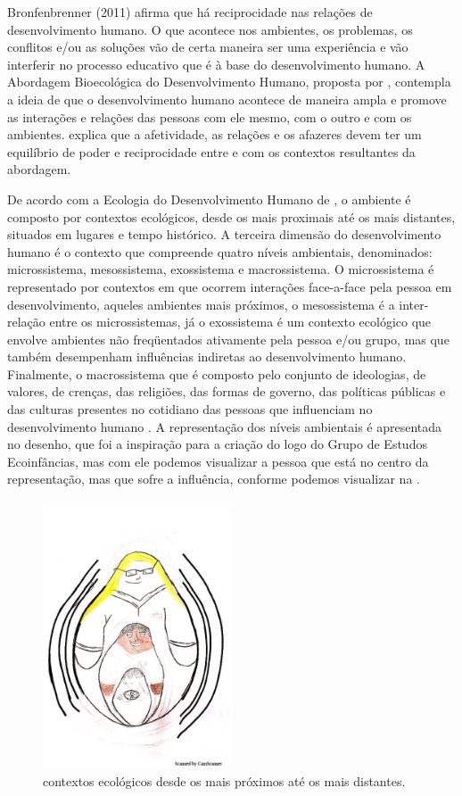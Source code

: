 \documentclass{textolivre-html}
\begin{document}
Bronfenbrenner (2011) afirma que há reciprocidade nas relações de desenvolvimento humano. O que acontece nos ambientes, os problemas, os conflitos e/ou as soluções vão de certa maneira ser uma experiência e vão interferir no processo educativo que é à base do desenvolvimento humano. A Abordagem Bioecológica do Desenvolvimento Humano, proposta por \textcite{brofen2011}, contempla a ideia de que o desenvolvimento humano acontece de maneira ampla e promove as interações e relações das pessoas com ele mesmo, com o outro e com os ambientes. \textcite{brofen1996} explica que a afetividade, as relações e os afazeres devem ter um equilíbrio de poder e reciprocidade entre e com os contextos resultantes da abordagem. 

De acordo com a Ecologia do Desenvolvimento Humano de \textcite{brofen1996}, o ambiente é composto por contextos ecológicos, desde os mais proximais até os mais distantes, situados em lugares e tempo histórico. A terceira dimensão do desenvolvimento humano é o contexto que compreende quatro níveis ambientais, denominados: microssistema, mesossistema, exossistema e macrossistema. O microssistema é representado por contextos em que ocorrem interações face-a-face pela pessoa em desenvolvimento, aqueles ambientes mais próximos, o mesossistema é a inter-relação entre os microssistemas, já o exossistema é um contexto ecológico que envolve ambientes não freqüentados ativamente pela pessoa e/ou grupo, mas que também desempenham influências indiretas ao desenvolvimento humano. Finalmente, o macrossistema que é composto pelo conjunto de ideologias, de valores, de crenças, das religiões, das formas de governo, das políticas públicas e das culturas presentes no cotidiano das pessoas que influenciam no desenvolvimento humano \cite{brofen1996,piske2019}. A representação dos níveis ambientais é apresentada no desenho, que foi a inspiração para a criação do logo do Grupo de Estudos Ecoinfâncias, mas com ele podemos visualizar a pessoa que está no centro da representação, mas que sofre a influência, conforme podemos visualizar na .

\begin{figure}[h!]
 \centering
 \includegraphics[width=0.5\textwidth]{figure01.pdf}
 \caption{contextos ecológicos desde os mais próximos até os mais distantes.}
 \label{fig-fig01}
\end{figure}
\end{document}
